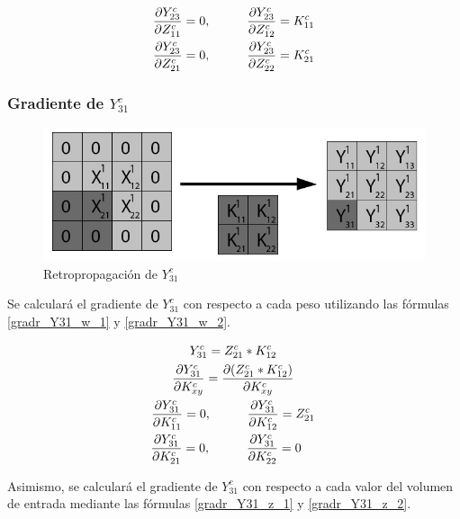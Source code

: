 \begin{gather}
	\frac{\partial Y^c_{23}}{\partial Z^c_{11}} = 0, \hspace{10mm} \frac{\partial Y^c_{23}}{\partial Z^c_{12}} = K^c_{11}\\
	\frac{\partial Y^c_{23}}{\partial Z^c_{21}} = 0, \hspace{10mm} \frac{\partial Y^c_{23}}{\partial Z^c_{22}} = K^c_{21}
\end{gather}

\subsubsection{Gradiente de $Y^c_{31}$}

\begin{figure}[H]
	\centering
	\includegraphics[width=0.8\linewidth]{imagenes/conv_back_padding_7.jpg} 
	\caption{Retropropagación de $Y^c_{31}$}
\end{figure}

Se calculará el gradiente de $Y^c_{31}$ con respecto a cada peso utilizando las fórmulas \ref{gradr_Y31_w_1} y \ref{gradr_Y31_w_2}.

\begin{gather}
	Y^c_{31} = Z^c_{21} * K^c_{12} \\
	\frac{\partial Y^c_{31}}{\partial K^c_{xy}} = \frac{\partial (Z^c_{21} * K^c_{12})}{\partial K^c_{xy}} \\
	\frac{\partial Y^c_{31}}{\partial K^c_{11}} = 0, \hspace{10mm} \frac{\partial Y^c_{31}}{\partial K^c_{12}} = Z^c_{21} \label{gradr_Y31_w_1} \\
	\frac{\partial Y^c_{31}}{\partial K^c_{21}} = 0, \hspace{10mm} \frac{\partial Y^c_{31}}{\partial K^c_{22}} = 0 \hspace{4mm} \label{gradr_Y31_w_2}
\end{gather}

Asimismo, se calculará el gradiente de $Y^c_{31}$ con respecto a cada valor del volumen de entrada mediante las fórmulas \ref{gradr_Y31_z_1} y \ref{gradr_Y31_z_2}.

